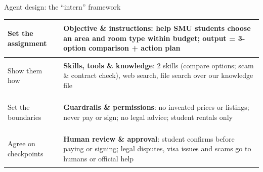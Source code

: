 \documentclass[aspectratio=169,11pt]{beamer}
\begin{document}
\begin{frame}{Agent design: the ``intern'' framework}
\small
\begin{tabularx}{\textwidth}{>{\bfseries\raggedright\arraybackslash}p{3.2cm} X}
\toprule
Set the assignment & \textbf{Objective \& instructions}: help SMU students choose an area and room type within budget; output = 3-option comparison + action plan \\
\midrule
Show them how & \textbf{Skills, tools \& knowledge}: 2 skills (compare options; scam \& contract check), web search, file search over our knowledge file \\
\midrule
Set the boundaries & \textbf{Guardrails \& permissions}: no invented prices or listings; never pay or sign; no legal advice; student rentals only \\
\midrule
Agree on checkpoints & \textbf{Human review \& approval}: student confirms before paying or signing; legal disputes, visa issues and scams go to humans or official help \\
\bottomrule
\end{tabularx}
\end{frame}
\end{document}
